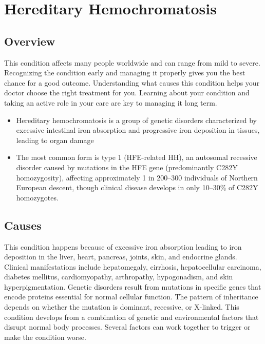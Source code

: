 \chapter{Hereditary Hemochromatosis}
\label{sec:Hereditary Hemochromatosis}

\section{Overview}
This condition affects many people worldwide and can range from mild to severe. Recognizing the condition early and managing it properly gives you the best chance for a good outcome. Understanding what causes this condition helps your doctor choose the right treatment for you. Learning about your condition and taking an active role in your care are key to managing it long term.

\begin{itemize}[noitemsep]
  \item Hereditary hemochromatosis is a group of genetic disorders characterized by excessive intestinal iron absorption and progressive iron deposition in tissues, leading to organ damage
  \item The most common form is type 1 (HFE-related HH), an autosomal recessive disorder caused by mutations in the HFE gene (predominantly C282Y homozygosity), affecting approximately 1 in 200--300 individuals of Northern European descent, though clinical disease develops in only 10--30\% of C282Y homozygotes.
\end{itemize}

\section{Causes}
This condition happens because of excessive iron absorption leading to iron deposition in the liver, heart, pancreas, joints, skin, and endocrine glands. Clinical manifestations include hepatomegaly, cirrhosis, hepatocellular carcinoma, diabetes mellitus, cardiomyopathy, arthropathy, hypogonadism, and skin hyperpigmentation. Genetic disorders result from mutations in specific genes that encode proteins essential for normal cellular function. The pattern of inheritance depends on whether the mutation is dominant, recessive, or X-linked. This condition develops from a combination of genetic and environmental factors that disrupt normal body processes. Several factors can work together to trigger or make the condition worse.

